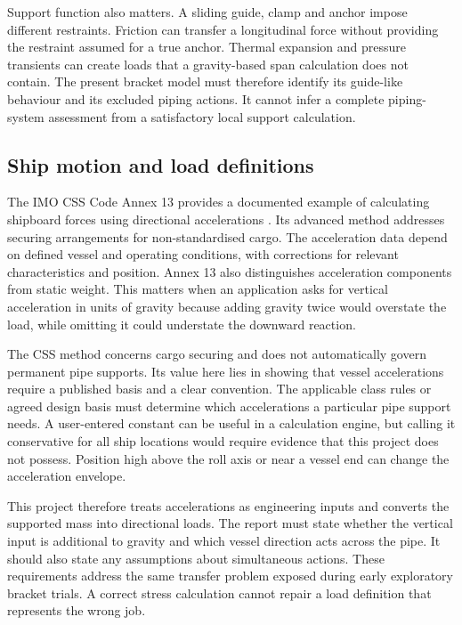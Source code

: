 Support function also matters. A sliding guide, clamp and anchor impose different restraints. Friction can transfer a longitudinal force without providing the restraint assumed for a true anchor. Thermal expansion and pressure transients can create loads that a gravity-based span calculation does not contain. The present bracket model must therefore identify its guide-like behaviour and its excluded piping actions. It cannot infer a complete piping-system assessment from a satisfactory local support calculation.

\subsection{Ship motion and load definitions}
\label{sec:lit-ship-accelerations}

The IMO CSS Code Annex 13 provides a documented example of calculating shipboard forces using directional accelerations \cite{imoCSS13}. Its advanced method addresses securing arrangements for non-standardised cargo. The acceleration data depend on defined vessel and operating conditions, with corrections for relevant characteristics and position. Annex 13 also distinguishes acceleration components from static weight. This matters when an application asks for vertical acceleration in units of gravity because adding gravity twice would overstate the load, while omitting it could understate the downward reaction.

The CSS method concerns cargo securing and does not automatically govern permanent pipe supports. Its value here lies in showing that vessel accelerations require a published basis and a clear convention. The applicable class rules or agreed design basis must determine which accelerations a particular pipe support needs. A user-entered constant can be useful in a calculation engine, but calling it conservative for all ship locations would require evidence that this project does not possess. Position high above the roll axis or near a vessel end can change the acceleration envelope.

This project therefore treats accelerations as engineering inputs and converts the supported mass into directional loads. The report must state whether the vertical input is additional to gravity and which vessel direction acts across the pipe. It should also state any assumptions about simultaneous actions. These requirements address the same transfer problem exposed during early exploratory bracket trials. A correct stress calculation cannot repair a load definition that represents the wrong job.

